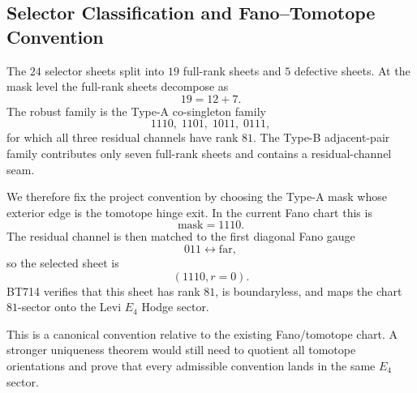 \subsection{Selector Classification and Fano--Tomotope Convention}
\label{sec:selector-classification}

The \(24\) selector sheets split into \(19\) full-rank sheets and \(5\) defective sheets.
At the mask level the full-rank sheets decompose as
\[
19=12+7.
\]
The robust family is the Type-A co-singleton family
\[
1110,\;1101,\;1011,\;0111,
\]
for which all three residual channels have rank \(81\).  The Type-B adjacent-pair
family contributes only seven full-rank sheets and contains a residual-channel seam.

We therefore fix the project convention by choosing the Type-A mask whose exterior
edge is the tomotope hinge exit.  In the current Fano chart this is
\[
\mathrm{mask}=1110.
\]
The residual channel is then matched to the first diagonal Fano gauge
\[
011\leftrightarrow\mathrm{far},
\]
so the selected sheet is
\[
(1110,r=0).
\]
BT714 verifies that this sheet has rank \(81\), is boundaryless, and maps the chart
\(81\)-sector onto the Levi \(E_4\) Hodge sector.

This is a canonical convention relative to the existing Fano/tomotope chart.  A
stronger uniqueness theorem would still need to quotient all tomotope orientations
and prove that every admissible convention lands in the same \(E_4\) sector.

